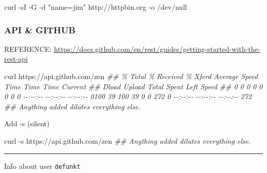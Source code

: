 \documentclass[
  10pt,
]{article}
\newenvironment{Shaded}{\begin{snugshade}}{\end{snugshade}}
\newcommand{\CommentTok}[1]{\textcolor[rgb]{0.56,0.35,0.01}{\textit{#1}}}
\newcommand{\NormalTok}[1]{#1}
\newcommand{\StringTok}[1]{\textcolor[rgb]{0.31,0.60,0.02}{#1}}
\begin{document}
\begin{Shaded}
\begin{Highlighting}[]
\NormalTok{curl {-}sI {-}G {-}d }\StringTok{"name=jim"}\NormalTok{ http://httpbin.org {-}o /dev/null}
\end{Highlighting}
\end{Shaded}

\hypertarget{api-github}{%
\subsubsection{API \& GITHUB}\label{api-github}}

REFERENCE:
\url{https://docs.github.com/en/rest/guides/getting-started-with-the-rest-api}

\begin{Shaded}
\begin{Highlighting}[]
\NormalTok{curl https://api.github.com/zen}
      \CommentTok{\#\#   \% Total    \% Received \% Xferd  Average Speed   Time    Time     Time  Current}
      \CommentTok{\#\#                                  Dload  Upload   Total   Spent    Left  Speed}
      \CommentTok{\#\#   0     0    0     0    0     0      0      0 {-}{-}:{-}{-}:{-}{-} {-}{-}:{-}{-}:{-}{-} {-}{-}:{-}{-}:{-}{-}     0100    39  100    39    0     0    272      0 {-}{-}:{-}{-}:{-}{-} {-}{-}:{-}{-}:{-}{-} {-}{-}:{-}{-}:{-}{-}   272}
      \CommentTok{\#\# Anything added dilutes everything else.}
\end{Highlighting}
\end{Shaded}

Add -s (silent)

\begin{Shaded}
\begin{Highlighting}[]
\NormalTok{curl {-}s  https://api.github.com/zen}
      \CommentTok{\#\# Anything added dilutes everything else.}
\end{Highlighting}
\end{Shaded}

\begin{center}\rule{0.5\linewidth}{0.5pt}\end{center}

Info about user \texttt{defunkt}
\end{document}
